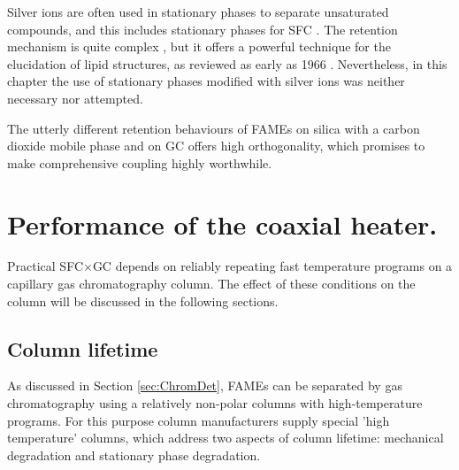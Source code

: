 Silver ions are often used in stationary phases to separate unsaturated
compounds, and this includes stationary phases for SFC \autocite{Sandra2002,
Potgieter2013}. The retention mechanism is quite complex
\autocite{Nikolova-Damyanova2019}, but it offers a powerful technique for the
elucidation of lipid structures, as reviewed as early as 1966
\autocite{Morris1966}. Nevertheless, in this chapter the use of stationary
phases modified with silver ions was neither necessary nor attempted.


The utterly different retention behaviours of FAMEs on silica with a carbon
dioxide mobile phase and on GC offers high orthogonality, which promises to make
comprehensive coupling highly worthwhile.

\section[Coaxial heater performance.]{Performance of the coaxial heater.}

Practical SFC×GC depends on reliably repeating fast temperature programs on a
capillary gas chromatography column. The effect of these conditions on the
column will be discussed in the following sections.

\subsection{Column lifetime}

As discussed in Section \ref{sec:ChromDet}, FAMEs can be separated by gas
chromatography using a relatively non-polar columns with high-temperature
programs. For this purpose column manufacturers supply special 'high
temperature' columns, which address two aspects of column lifetime: mechanical
degradation and stationary phase degradation. 

